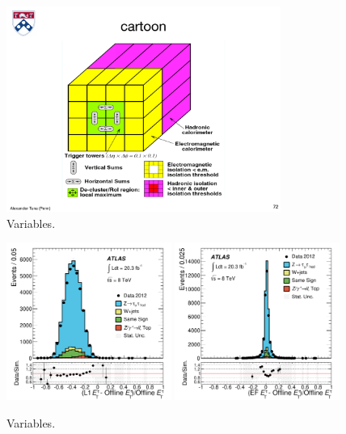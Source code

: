 \begin{figure}[tp]
  \centering
  \includegraphics[width=0.80\textwidth]{figures/trigger/cartoonL1}
  \caption{Variables.}
  \label{fig:prospects-trigger-cartoonL1}
\end{figure}

\begin{figure}[tp]
  \centering
  \includegraphics[width=0.48\textwidth]{figures/PERF-2013-06/fig_18a}
  \includegraphics[width=0.48\textwidth]{figures/PERF-2013-06/fig_18c}
  \caption{Variables.}
  \label{fig:prospects-trigger-resolution}
\end{figure}

